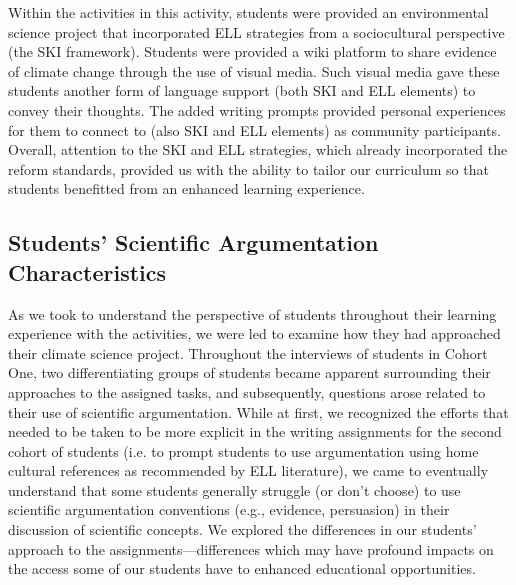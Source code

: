 \documentclass[11.5pt]{sig-alternate} %
\begin{document}
\begin{large}
Within the activities in this activity, students were provided an environmental science project that incorporated ELL strategies from a sociocultural perspective (the SKI framework). Students were provided a wiki platform to share evidence of climate change through the use of visual media. Such visual media gave these students another form of language support (both SKI and ELL elements) to convey their thoughts. The added writing prompts provided personal experiences for them to connect to (also SKI and ELL elements) as community participants. Overall, attention to the SKI and ELL strategies, which already incorporated the reform standards, provided us with the ability to tailor our curriculum so that students benefitted from an enhanced learning experience.

\subsection*{Students’ Scientific Argumentation Characteristics}

As we took to understand the perspective of students throughout their learning experience with the activities, we were led to examine how they had approached their climate science project. Throughout the interviews of students in Cohort One, two differentiating groups of students became apparent surrounding their approaches to the assigned tasks, and subsequently, questions arose related to their use of scientific argumentation. While at first, we recognized the efforts that needed to be taken to be more explicit in the writing assignments for the second cohort of students (i.e. to prompt students to use argumentation using home cultural references as recommended by ELL literature), we came to eventually understand that some students generally struggle (or don’t choose) to use scientific argumentation conventions (e.g., evidence, persuasion) in their discussion of scientific concepts. We explored the differences in our students’ approach to the assignments—differences which may have profound impacts on the access some of our students have to enhanced educational opportunities.


\end{large}
\end{document}
